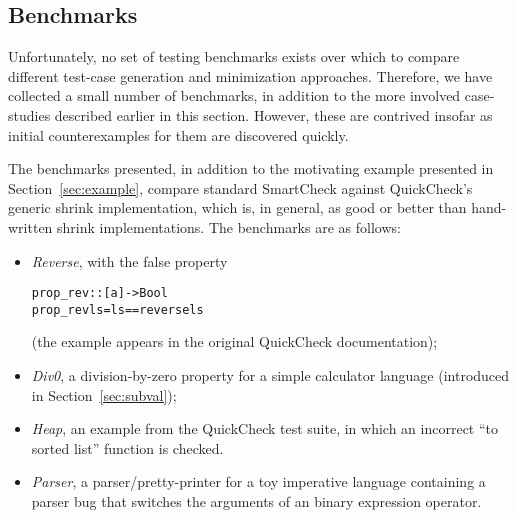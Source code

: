 \documentclass{sigplanconf}
\newenvironment{code}{\begin{alltt}\footnotesize}{\end{alltt}}
\newcommand{\ttp}[1]{\texttt{#1}}
\begin{document}


\subsection{Benchmarks}\label{sec:benchmarks}

Unfortunately, no set of testing benchmarks exists over which to compare
different test-case generation and minimization approaches.  Therefore, we have
collected a small number of benchmarks, in addition to the more involved
case-studies described earlier in this section.  However, these are contrived
insofar as initial counterexamples for them are discovered quickly.

The benchmarks presented, in addition to the motivating example presented in
Section~\ref{sec:example}, compare standard SmartCheck against QuickCheck's
generic shrink implementation, which is, in general, as good or better than
hand-written shrink implementations.  The benchmarks are as follows:

\begin{itemize}
  \item  \emph{Reverse}, with the false property
\begin{code}
prop_rev :: [a] -> Bool
prop_rev ls = ls == reverse ls
\end{code}
\noindent
(the example appears in the original QuickCheck documentation);

  \item \emph{Div0}, a division-by-zero property for a simple calculator
    language (introduced in Section~\ref{sec:subval});

  \item \emph{Heap}, an example from the QuickCheck test suite, in which an
    incorrect ``to sorted list'' function is checked.

  \item \emph{Parser}, a parser/pretty-printer for a toy imperative language
    containing a parser bug that switches the arguments of an binary expression
    operator.
\end{itemize}
\end{document}
